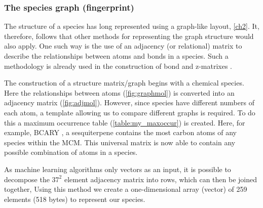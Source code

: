 \subsubsection{The species graph (fingerprint)}\label{sec:specgraph}

The structure of a species has long represented using a graph-like layout, \autoref{ch2}. It, therefore, follows that other methods for representing the graph structure would also apply. One such way is the use of an adjacency (or relational) matrix to describe the relationships between atoms and bonds in a species. Such a methodology is already used in the construction of bond and z-matrixes \citep{mcmgen,zmatrix}. 

The construction of a structure matrix/graph begins with a chemical species. Here the relationships between atoms (\autoref{fig:graphmol}) is converted into an adjacency matrix (\autoref{fig:adjmol}). However, since species have different numbers of each atom, a template allowing us to compare different graphs is required. To do this a maximum occurrence table (\autoref{table:my_maxoccur}) is created. Here, for example, BCARY , a sesquiterpene contains the most carbon atoms of any species within the MCM. This universal matrix is now able to contain any possible combination of atoms in a species. 

As machine learning algorithms only vectors as an input, it is possible to decompose the $37^2$ element adjacency matrix into rows, which can then be joined together, Using this method we create a one-dimensional array (vector) of 259 elements (518 bytes) to represent our species.


